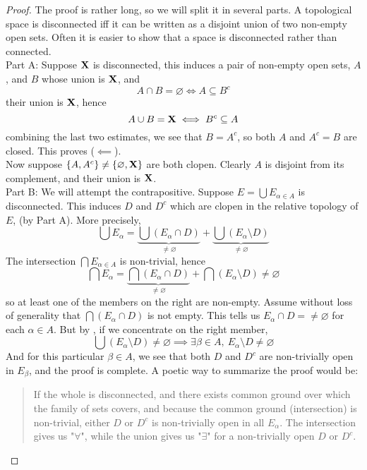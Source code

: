 \documentclass[../../main.tex]{subfiles}
\begin{document}
\begin{proof}
    The proof is rather long, so we will split it in several parts. A topological space is disconnected iff it can be written as a disjoint union of two non-empty open sets. Often it is easier to show that a space is disconnected rather than connected.\\

    Part A: Suppose ${\mathbf{X}}$ is disconnected, this induces a pair of non-empty open sets, $A$, and $B$ whose union is ${\mathbf{X}}$, and 
    \[
        A\cap B = \varnothing\iff A \subseteq B^c
    \]
    their union is ${\mathbf{X}}$, hence
    \[
        A\cup B = {\mathbf{X}}\iff B^c\subseteq A
    \]
    combining the last two estimates, we see that $B = A^c$, so both $A$ and $A^c = B$ are closed. This proves ($\impliedby$).\\
    Now suppose $\{A, A^c\}\neq \{\varnothing,{\mathbf{X}}\}$ are both clopen. Clearly $A$ is disjoint from its complement, and their union is ${\mathbf{X}}$.\\

    Part B: We will attempt the contrapositive. Suppose $E = \bigcup E_{\alpha\in A}$ is disconnected. This induces $D$ and $D^c$ which are clopen in the relative topology of $E$, (by Part A). More precisely,
    \begin{equation}\label{chp4:ex4.10-union-non-empty}
        \bigcup E_\alpha = \underbrace{\bigcup (E_\alpha\cap D)}_{\neq\varnothing} + \underbrace{\bigcup (E_\alpha\setminus D)}_{\neq\varnothing}
    \end{equation}
    The intersection $\bigcap E_{\alpha\in A}$ is non-trivial, hence
    \begin{equation}\label{chp4:ex4.10-intersection-non-empty}
        \bigcap E_\alpha = \underbrace{\bigcap (E_\alpha\cap D)}_{\neq\varnothing} + \bigcap (E_\alpha\setminus D) \neq\varnothing
    \end{equation}    
    so at least one of the members on the right are non-empty. Assume without loss of generality that $\bigcap (E_\alpha\cap D)$ is not empty. This tells us $E_\alpha\cap D=\neq\varnothing$ for each $\alpha\in A$. But by , if we concentrate on the right member, 
    \[
        \bigcup (E_\alpha\setminus D)\neq\varnothing\implies\exists\beta\in A,\: E_\alpha\setminus D \neq\varnothing
    \]
    And for this particular $\beta\in A$, we see that both $D$ and $D^c$ are non-trivially open in $E_\beta$, and the proof is complete. A poetic way to summarize the proof would be:
    \begin{quote}
        If the whole is disconnected, and there exists common ground over which the family of sets covers, and because the common ground (intersection) is non-trivial, either $D$ or $D^c$ is non-trivially open in all $E_\alpha$. The intersection gives us "$\forall$", while the union gives us "$\exists$" for a non-trivially open $D$ or $D^c$.
    \end{quote}


\end{proof}
\end{document}
